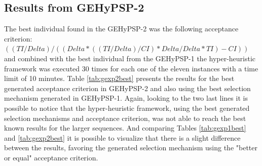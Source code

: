 \documentclass[conference]{IEEEtran}
\begin{document}
\begin{table}[]
	\centering
	\caption{Results from the best individual found in GEHyPSP-1}
	\label{tab:gexp1best}
\end{table}

\subsection{Results from GEHyPSP-2}

The best individual found in the GEHyPSP-2 was the following acceptance criterion:  $( ( TI / Delta ) / ( ( Delta * ( ( TI / Delta ) / CI ) * Delta / Delta * TI ) - CI ) )$ and combined with the best individual from the GEHyPSP-1 the hyper-heuristic framework was executed 30 times for each one of the eleven instances with a time limit of 10 minutes. Table \ref{tab:gexp2best} presents the results for the best generated acceptance criterion in GEHyPSP-2 and also using the best selection mechanism generated in GEHyPSP-1. Again, looking to the two last lines it is possible to notice that the hyper-heuristic framework, using the best generated selection mechanisms and acceptance criterion, was not able to reach the best known results for the larger sequences. And comparing Tables \ref{tab:gexp1best} and \ref{tab:gexp2best} it is possible to visualize that there is a slight difference between the results, favoring the generated selection mechanism using the "better or equal" acceptance criterion.
\end{document}
